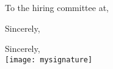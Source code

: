 \documentclass[letterpaper,11pt]{letter}
\begin{document}
\begin{letter}{}

\opening{To the hiring committee at,}


\closing{Sincerely, }
Sincerely,\\[\medskipamount]  %
\texttt{[image: mysignature]}\\[\medskipamount]
\fromsig
\end {letter}
\end{document}
